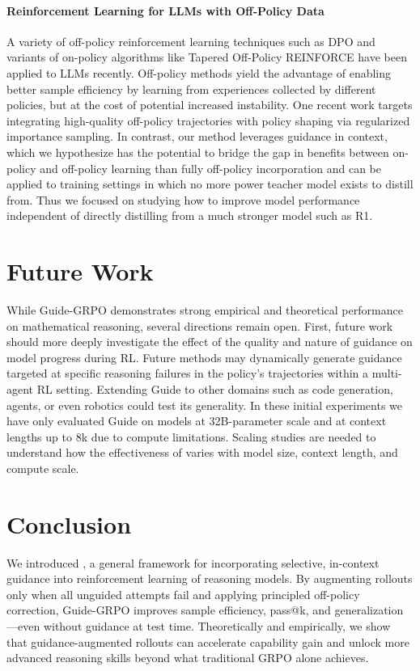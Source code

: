 \documentclass{article}
\begin{document}
\paragraph{Reinforcement Learning for LLMs with Off-Policy Data}
A variety of off-policy reinforcement learning techniques such as DPO \cite{rafailov2023direct} and variants of on-policy algorithms like Tapered Off-Policy REINFORCE \cite{leroux2025tapered} have been applied to LLMs recently. Off-policy methods yield the advantage of enabling better sample efficiency by learning from experiences collected by different policies, but at the cost of potential increased instability. One recent work \cite{yan2025luffy} targets integrating high-quality off-policy trajectories with policy shaping via regularized importance sampling. In contrast, our method leverages guidance in context, which we hypothesize has the potential to bridge the gap in benefits between on-policy and off-policy learning than fully off-policy incorporation and can be applied to training settings in which no more power teacher model exists to distill from. Thus we focused on studying how to improve model performance independent of directly distilling from a much stronger model such as R1.

\section{Future Work}
\label{sec:limiations}
While Guide-GRPO demonstrates strong empirical and theoretical performance on mathematical reasoning, several directions remain open. First, future work should more deeply investigate the effect of the quality and nature of guidance on model progress during RL. Future methods may dynamically generate guidance targeted at specific reasoning failures in the policy’s trajectories within a multi-agent RL setting.
Extending Guide to other domains such as code generation, agents, or even robotics could test its generality.  In these initial experiments we have only evaluated Guide on models at 32B-parameter scale and at context lengths up to 8k due to compute limitations. Scaling studies are needed to understand how the effectiveness of  varies with model size, context length, and compute scale.

\section{Conclusion}
We introduced , a general framework for incorporating selective, in-context guidance into reinforcement learning of reasoning models. By augmenting rollouts only when all unguided attempts fail and applying principled off-policy correction, Guide-GRPO improves sample efficiency, pass@k, and generalization—even without guidance at test time. Theoretically and empirically, we show that guidance-augmented rollouts can accelerate capability gain and unlock more advanced reasoning skills beyond what traditional GRPO alone achieves.
\end{document}
